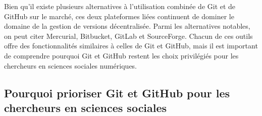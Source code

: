 \documentclass[
  letterpaper,
]{scrbook}
\begin{document}
Bien qu'il existe plusieurs alternatives à l'utilisation combinée de Git
et de GitHub sur le marché, ces deux plateformes liées continuent de
dominer le domaine de la gestion de versions décentralisée. Parmi les
alternatives notables, on peut citer Mercurial, Bitbucket, GitLab et
SourceForge. Chacun de ces outils offre des fonctionnalités similaires à
celles de Git et GitHub, mais il est important de comprendre pourquoi
Git et GitHub restent les choix privilégiés pour les chercheurs en
sciences sociales numériques.

\hypertarget{pourquoi-prioriser-git-et-github-pour-les-chercheurs-en-sciences-sociales}{%
\subsection{Pourquoi prioriser Git et GitHub pour les chercheurs en
sciences
sociales}\label{pourquoi-prioriser-git-et-github-pour-les-chercheurs-en-sciences-sociales}}
\end{document}
